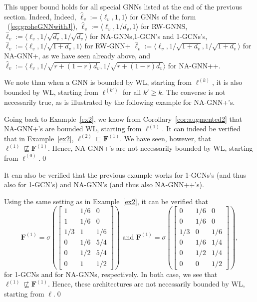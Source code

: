 This upper bound holds for all special GNNs listed at the end of the previous section. Indeed,
Indeed, $\hat{\pmb{\ell}}_v:=\langle \pmb{\ell}_v,1,1\rangle$ for GNNs of the form ~(\ref{eq:groheGNNwithJ}),
$\hat{\pmb{\ell}}_v:=\langle \pmb{\ell}_v,1/d_{v},1\rangle$ for RW-GNNS,
$\hat{\pmb{\ell}}_v:=\langle \pmb{\ell}_v,1/\sqrt{d_{v}},1/\sqrt{d_{v}}\rangle$ for NA-GNNs,1-GCN's and 1-GCNs's, 
$\hat{\pmb{\ell}}_v:=\langle \pmb{\ell}_v,1/\sqrt{1+d_{v}},1\rangle$ for RW-GNN+
$\hat{\pmb{\ell}}_v:=\langle \pmb{\ell}_v,1/\sqrt{1+d_{v}},1/\sqrt{1+d_{v}}\rangle$ for NA-GNN+, as we have seen already above, and 
$\hat{\pmb{\ell}}_v:=\langle \pmb{\ell}_v,1/\sqrt{r+(1-r)d_{v}},1/\sqrt{r+(1-r)d_{v}}\rangle$ 
for NA-GNN++.

We note than when a GNN is bounded by WL, starting from $\pmb{\ell}^{(k)}$, it is also bounded by WL, starting from $\pmb{\ell}^{(k')}$ for all $k'\geq k$. The converse is not necessarily true, as is illustrated by the following example for NA-GNN+'s.
\begin{example}\label{ex4}\normalfont
Going back to  Example~\ref{ex2}, we know from Corollary~\ref{cor:augmented2} that NA-GNN+'s are bounded WL, starting from $\pmb{\ell}^{(1)}$. It can indeed be verified that in Example~\ref{ex2}, $\pmb{\ell}^{(2)}\sqsubseteq \mathbf{F}^{(1)}$. We have seen, however, that $\pmb{\ell}^{(1)}\not\sqsubseteq \mathbf{F}^{(1)}$. Hence, NA-GNN+'s are not necessarily bounded by WL, starting from $\pmb{\ell}^{(0)}$.\qed
\end{example}
It can also be verified that the previous example works for 1-GCNs's (and thus also for 1-GCN's) and NA-GNN's (and thus also NA-GNN++'s).
\begin{example}\normalfont
	Using the same setting as in Example~\ref{ex2}, it can be verified that 
	$$\mathbf{F}^{(1)}=\sigma\left(\begin{bmatrix}
	1 & 1/6 & 0\\
	1 & 1/6 & 0\\
	1/3 & 1 & 1/6\\
	0 & 1/6 & 5/4\\
	0 & 1/2 & 5/4\\
    0 & 1 & 1/2	\end{bmatrix}\right) \text{ and }
 \mathbf{F}^{(1)}=\sigma\left(\begin{bmatrix}
	0 & 1/6 & 0\\
	0 & 1/6 & 0\\
	1/3 & 0 & 1/6\\
	0 & 1/6 & 1/4\\
	0 & 1/2 & 1/4\\
    0 & 0 & 1/2	\end{bmatrix}\right), $$
	for 1-GCNs and for NA-GNNs, respectively. In both case, we see that $\pmb{\ell}^{(1)}\not\sqsubseteq \mathbf{F}^{(1)}$. Hence, these architectures are not necessarily bounded by WL, starting from $\pmb{\ell}$.\qed
\end{example}


